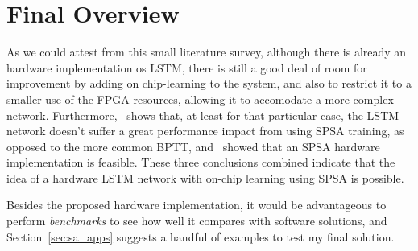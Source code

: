 \section{Final Overview}\label{sec:overview}
As we could attest from this small literature survey, although there is already an hardware implementation os LSTM, there is still a good deal of room for improvement by adding on chip-learning to the system, and also to restrict it to a smaller use of the FPGA resources, allowing it to accomodate a more complex network. Furthermore,~\cite{Tavear13} shows that, at least for that particular case, the LSTM network doesn't suffer a great performance impact from using SPSA training, as opposed to the more common BPTT, and~\cite{Maeda05} showed that an SPSA hardware implementation is feasible. These three conclusions combined indicate that the idea of a hardware LSTM network with on-chip learning using SPSA is possible. 

Besides the proposed hardware implementation, it would be advantageous to perform \emph{benchmarks} to see how well it compares with software solutions, and Section~\ref{sec:sa_apps} suggests a handful of examples to test my final solution.
